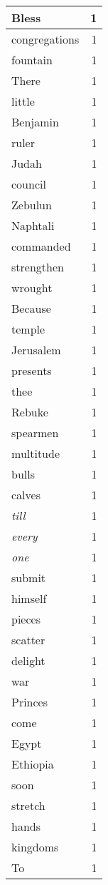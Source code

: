 \begin{center}
\begin{longtable}{l|r}
Bless & 1 \\ \hline
congregations & 1 \\ \hline
fountain & 1 \\ \hline
There & 1 \\ \hline
little & 1 \\ \hline
Benjamin & 1 \\ \hline
ruler & 1 \\ \hline
Judah & 1 \\ \hline
council & 1 \\ \hline
Zebulun & 1 \\ \hline
Naphtali & 1 \\ \hline
commanded & 1 \\ \hline
strengthen & 1 \\ \hline
wrought & 1 \\ \hline
Because & 1 \\ \hline
temple & 1 \\ \hline
Jerusalem & 1 \\ \hline
presents & 1 \\ \hline
thee & 1 \\ \hline
Rebuke & 1 \\ \hline
spearmen & 1 \\ \hline
multitude & 1 \\ \hline
bulls & 1 \\ \hline
calves & 1 \\ \hline
\emph{till} & 1 \\ \hline
\emph{every} & 1 \\ \hline
\emph{one} & 1 \\ \hline
submit & 1 \\ \hline
himself & 1 \\ \hline
pieces & 1 \\ \hline
scatter & 1 \\ \hline
delight & 1 \\ \hline
war & 1 \\ \hline
Princes & 1 \\ \hline
come & 1 \\ \hline
Egypt & 1 \\ \hline
Ethiopia & 1 \\ \hline
soon & 1 \\ \hline
stretch & 1 \\ \hline
hands & 1 \\ \hline
kingdoms & 1 \\ \hline
To & 1 \\ \hline

\end{longtable}
\end{center}
